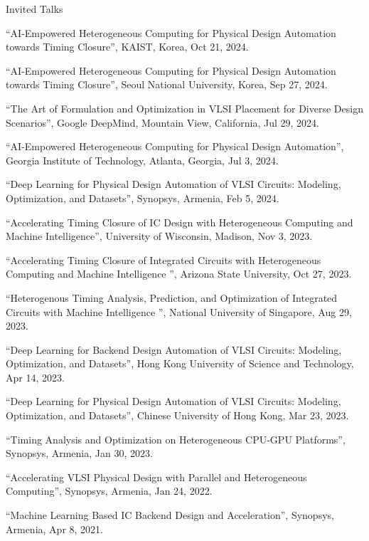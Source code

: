 \begin{rSection}{Invited Talks}
\begin{description}[font=\normalfont]
\item[{[13]}]{
``AI-Empowered Heterogeneous Computing for Physical Design Automation towards Timing Closure'', KAIST, Korea, Oct 21, 2024. 
}

\item[{[12]}]{
``AI-Empowered Heterogeneous Computing for Physical Design Automation towards Timing Closure'', Seoul National University, Korea, Sep 27, 2024. 
}

\item[{[11]}]{
``The Art of Formulation and Optimization in VLSI Placement for Diverse Design Scenarios'', Google DeepMind, Mountain View, California, Jul 29, 2024. 
}

\item[{[10]}]{
``AI-Empowered Heterogeneous Computing for Physical Design Automation'', Georgia Institute of Technology, Atlanta, Georgia, Jul 3, 2024. 
}

\item[{[9]}]{
``Deep Learning for Physical Design Automation of VLSI Circuits: Modeling, Optimization, and Datasets'', Synopsys, Armenia, Feb 5, 2024. 
}

\item[{[8]}]{
``Accelerating Timing Closure of IC Design with Heterogeneous Computing and Machine Intelligence'', University of Wisconsin, Madison, Nov 3, 2023. 
}

\item[{[7]}]{
``Accelerating Timing Closure of Integrated Circuits with Heterogeneous Computing and Machine Intelligence '', Arizona State University, Oct 27, 2023. 
}

\item[{[6]}]{
``Heterogenous Timing Analysis, Prediction, and Optimization of Integrated Circuits with Machine Intelligence '', National University of Singapore, Aug 29, 2023. 
}

\item[{[5]}]{
``Deep Learning for Backend Design Automation of VLSI Circuits: Modeling, Optimization, and Datasets'', Hong Kong University of Science and Technology, Apr 14, 2023. 
}

\item[{[4]}]{
``Deep Learning for Physical Design Automation of VLSI Circuits: Modeling, Optimization, and Datasets'', Chinese University of Hong Kong, Mar 23, 2023. 
}

\item[{[3]}]{
``Timing Analysis and Optimization on Heterogeneous CPU-GPU Platforms'', Synopsys, Armenia, Jan 30, 2023. 
}

\item[{[2]}]{
``Accelerating VLSI Physical Design with Parallel and Heterogeneous Computing'', Synopsys, Armenia, Jan 24, 2022. 
}

\item[{[1]}]{
``Machine Learning Based IC Backend Design and Acceleration'', Synopsys, Armenia, Apr 8, 2021. 
}

\end{description}

\end{rSection}
